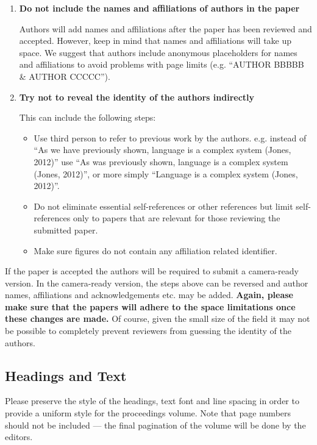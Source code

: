 \documentclass{evolang}
\begin{document}
\begin{enumerate}
\item  \textbf{Do not include the names and affiliations of authors in the paper}

Authors will add names and affiliations after the paper has been reviewed and accepted.  However, keep in mind that names and affiliations will take up space.  We suggest that authors include anonymous placeholders for names and affiliations to avoid problems with page limits (e.g. ``AUTHOR BBBBB \& AUTHOR CCCCC'').

\item \textbf{Try not to reveal the identity of the authors indirectly}

This can include the following steps:

\begin{itemize}
\item Use third person to refer to previous work by the authors.  e.g. instead of ``As we have previously shown, language is a complex system (Jones, 2012)'' use ``As was previously shown, language is a complex system (Jones, 2012)'', or more simply ``Language is a complex system (Jones, 2012)''.
\item Do not eliminate essential self-references or other references but limit self-references only to papers that are relevant for those reviewing the submitted paper.
\item Make sure figures do not contain any affiliation related identifier.
\end{itemize}

\end{enumerate}

If the paper is accepted the authors will be required to submit a camera-ready version.  In the camera-ready version, the steps above can be reversed and author names, affiliations and acknowledgements etc. may be added.  \textbf{Again, please make sure that the papers will adhere to the space limitations once these changes are made.}  Of course, given the small size of the field it may not be possible to completely prevent reviewers from guessing the identity of the authors.  


\subsection{Headings and Text}

Please preserve the style of the headings, text font and line spacing in order to provide a uniform style for the proceedings volume.  Note that page numbers should not be included --- the final pagination of the volume will be done by the editors.
\end{document}
